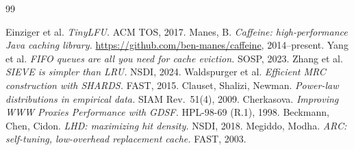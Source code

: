 \documentclass[letterpaper,twocolumn,10pt]{article}
\begin{document}
\begin{thebibliography}{99}
\scriptsize
\setlength{\itemsep}{0pt}
\setlength{\parsep}{0pt}

 Einziger et al. \textit{TinyLFU.} ACM TOS, 2017.
 Manes, B. \textit{Caffeine: high-performance Java caching library.} \url{https://github.com/ben-manes/caffeine}, 2014--present.
 Yang et al. \textit{FIFO queues are all you need for cache eviction.} SOSP, 2023.
 Zhang et al. \textit{SIEVE is simpler than LRU.} NSDI, 2024.
 Waldspurger et al. \textit{Efficient MRC construction with SHARDS.} FAST, 2015.
 Clauset, Shalizi, Newman. \textit{Power-law distributions in empirical data.} SIAM Rev.\ 51(4), 2009.
 Cherkasova. \textit{Improving WWW Proxies Performance with GDSF.} HPL-98-69 (R.1), 1998.
 Beckmann, Chen, Cidon. \textit{LHD: maximizing hit density.} NSDI, 2018.
 Megiddo, Modha. \textit{ARC: self-tuning, low-overhead replacement cache.} FAST, 2003.

\end{thebibliography}
\end{document}
